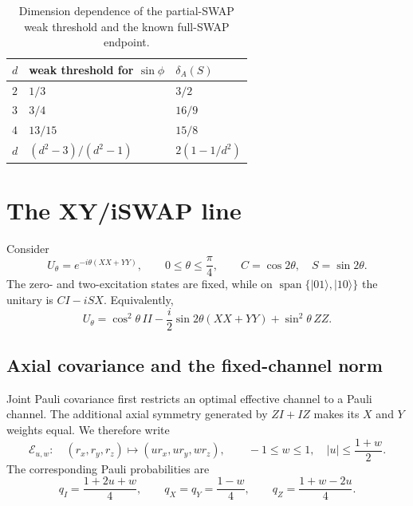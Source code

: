 \documentclass[11pt,a4paper]{article}
\theoremstyle{remark}
\newcommand{\cE}{\mathcal{E}}
\begin{document}
\begin{table}[t]
\centering
\caption{Dimension dependence of the partial-SWAP weak threshold and the known
full-SWAP endpoint.}
\label{tab:values}
\begin{tabular}{@{}lll@{}}
\toprule
$d$ & weak threshold for $\sin\phi$ & $\delta_A(S)$\\
\midrule
$2$ & $1/3$ & $3/2$\\
$3$ & $3/4$ & $16/9$\\
$4$ & $13/15$ & $15/8$\\
$d$ & $(d^2-3)/(d^2-1)$ & $2(1-1/d^2)$\\
\bottomrule
\end{tabular}
\end{table}

\section{The XY/iSWAP line}

Consider
\begin{equation}
 U_\theta=e^{-i\theta(XX+YY)},\qquad 0\leq\theta\leq\frac{\pi}{4},
 \qquad C=\cos2\theta,\quad S=\sin2\theta.
 \label{eq:xy-unitary}
\end{equation}
The zero- and two-excitation states are fixed, while on
$\operatorname{span}\{|01\rangle,|10\rangle\}$ the unitary is
$C I-iS X$.  Equivalently,
\[
 U_\theta=\cos^2\theta\,II-\frac{i}{2}\sin2\theta(XX+YY)
           +\sin^2\theta\,ZZ.
\]

\subsection{Axial covariance and the fixed-channel norm}

Joint Pauli covariance first restricts an optimal effective channel to a Pauli
channel.  The additional axial symmetry generated by $ZI+IZ$ makes its $X$
and $Y$ weights equal.  We therefore write
\begin{equation}
 \cE_{u,w}:\quad (r_x,r_y,r_z)\longmapsto(ur_x,ur_y,wr_z),
 \qquad -1\leq w\leq1,\quad |u|\leq\frac{1+w}{2}.
 \label{eq:xy-channel}
\end{equation}
The corresponding Pauli probabilities are
\[
 q_I=\frac{1+2u+w}{4},\qquad q_X=q_Y=\frac{1-w}{4},\qquad
 q_Z=\frac{1+w-2u}{4}.
\]
\end{document}
